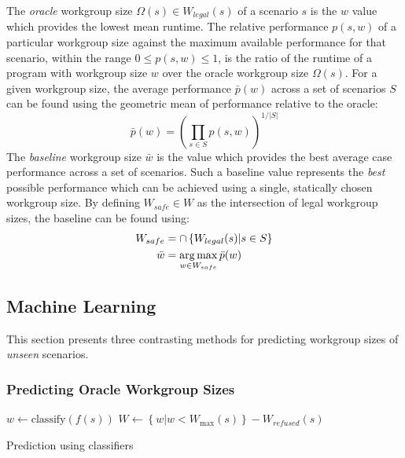   The \emph{oracle} workgroup size $\Omega(s) \in W_{legal}(s)$ of a scenario $s$ is the $w$ value which provides the lowest mean runtime. The relative performance $p(s,w)$ of a particular workgroup size against the maximum available performance for that scenario, within the range $0 \le p(s,w) \le 1$, is the ratio of the runtime of a program with workgroup size $w$ over the oracle workgroup size $\Omega(s)$. For a given workgroup size, the average performance $\bar{p}(w)$ across a set of scenarios $S$ can be found using the geometric mean of performance relative to the oracle:
  \begin{equation}
    \bar{p}(w) =
    \left(
    \prod_{s \in S} p(s, w)
    \right)^{1/|S|}
  \end{equation}
  The \emph{baseline} workgroup size $\bar{w}$ is the value which
  provides the best average case performance across a set of
  scenarios. Such a baseline value represents the \emph{best} possible
  performance which can be achieved using a single, statically chosen
  workgroup size. By defining $W_{safe} \in W$ as the intersection of
  legal workgroup sizes, the baseline can be found using:
  \begin{align}
    W_{safe} &= \cap \left\{ W_{legal}(s) | s \in S \right\}\\
    \bar{w} &= \operatorname*{arg\,max}_{w \in W_{safe}} \bar{p}(w)
  \end{align}


  \subsection{Machine Learning}

  This section presents three contrasting methods for predicting
  workgroup sizes of \emph{unseen} scenarios.


  \subsubsection{Predicting Oracle Workgroup Sizes}

  \begin{algorithm}[t]
    \SetAlgoLined

    $w \leftarrow \text{classify}(f(s))$\;
    $W \leftarrow \left\{ w | w < W_{\max}(s) \right\} - W_{refused}(s)$\;
    \caption{Prediction using classifiers}
    \label{alg:autotune-classification}
  \end{algorithm}

